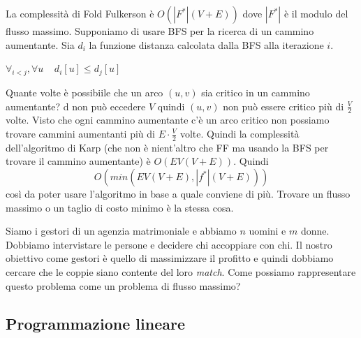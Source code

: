 \documentclass[a4paper]{article}
\begin{document}
\noindent
La complessità di Fold Fulkerson è $O(|F^\ast|(V+E))$ dove $|F^\ast|$ è il modulo del flusso massimo. 
Supponiamo di usare BFS per la ricerca di un cammino aumentante. Sia $d_i$ la funzione distanza calcolata dalla BFS alla iterazione $i$. 
\begin{lemma}
  $\forall_{i < j}, \forall u \; \; \; \;  d_i[u] \le d_j[u]$ 
\end{lemma}
Quante volte è possibiile che un arco $(u,v)$ sia critico in un cammino aumentante?
d non può eccedere $V$ quindi $(u,v)$ non può essere critico più di $\frac{V}{2}$ volte. 
Visto che ogni cammino aumentante c'è un arco critico non possiamo trovare cammini aumentanti più di $E \cdot \frac{V}{2}$ volte.
Quindi la complessità dell'algoritmo di Karp (che non è nient'altro che FF ma usando la BFS per trovare il cammino aumentante) è $O(EV(V+E))$.
Quindi \[O(min(EV(V+E), |f^\ast|(V+E)))\]
così da poter usare l'algoritmo in base a quale conviene di più.
Trovare un flusso massimo o un taglio di costo minimo è la stessa cosa. 

\ex{}
{
  Siamo i gestori di un agenzia matrimoniale e abbiamo $n$ uomini e $m$ donne. Dobbiamo intervistare le persone e decidere chi accoppiare con chi. 
  Il nostro obiettivo come gestori è quello di massimizzare il profitto e quindi dobbiamo cercare che le coppie siano contente del loro \textit{match}.
  Come possiamo rappresentare questo problema come un problema di flusso massimo? 
}



\subsection{Programmazione lineare}
\end{document}
